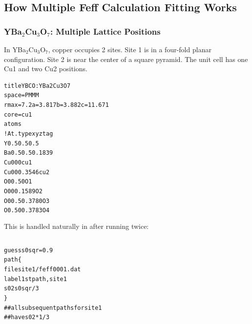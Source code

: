 \documentclass[10pt, xcolor=x11names, compress]{beamer}
\newcommand{\ybco}{YBa$_2$Cu$_3$O$_7$}
\begin{document}
\subsection[Explain]{How Multiple Feff Calculation Fitting Works}
\begin{frame}[fragile]
  \frametitle{\ybco: Multiple Lattice Positions}

  In {\ybco}, copper occupies 2 sites.  Site 1 is in a
  {\color{Blue3}four-fold planar} configuration.  Site 2 is near the
  center of a {\color{Blue3}square pyramid}.  The unit cell has
  \alert{one} Cu1 and \alert{two} Cu2 positions.
  
  \begin{center}

    \vskip -10pt

    \begin{minipage}{0.5\linewidth}
      \begin{block}{}
        \tiny
        \begin{alltt}
{\color{Green4}title YBCO: Y Ba2 Cu3 O7}
{\color{SteelBlue4}space} = P M M M
{\color{SteelBlue4}rmax}  = 7.2   {\color{SteelBlue4}a}=3.817 {\color{SteelBlue4}b}=3.882  {\color{SteelBlue4}c}=11.671
{\color{SteelBlue4}core}  = cu1
{\color{Purple4}atoms}
{\color{Blue4}! At.type   x        y       z       tag}
   Y       0.5      0.5     0.5
   Ba      0.5      0.5     0.1839
   Cu      0        0       0        cu1
   Cu      0        0       0.3546   cu2
   O       0        0.5     0        O1
   O       0        0       0.1589   O2
   O       0        0.5     0.3780   O3
   O       0.5      0       0.3783   O4
        \end{alltt}
      \end{block}
    \end{minipage}
  \end{center}

  This is handled naturally in {\ifeffit} after running {\feff} twice:

  \vskip -8pt
  
  \begin{columns}
    \begin{column}{0.5\linewidth}
      \scriptsize
      \begin{alltt}
  {\color{guessp}guess}  s0sqr = 0.9
  {\color{Purple4}path} \{
     {\color{Gold4}file}    site1/feff0001.dat
     {\color{Gold4}label}   1st path, site 1
     {\color{Gold4}s02}     s0sqr / 3
   \}
  {\color{Blue4}## all subsequent paths for site 1
  ## have} {\color{Gold4}s02}{\color{Blue4} * 1/3}
      \end{alltt}      
    \end{column}
    \begin{column}{0.5\linewidth}
      \scriptsize
      \begin{alltt}


\end{alltt}
\end{column}
\end{columns}
\end{frame}
\end{document}
